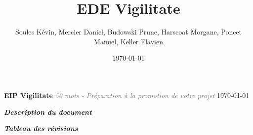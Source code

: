 \documentclass[a4paper,11pt]{report}
\title{EDE Vigilitate}
\author{Soules Kévin, Mercier Daniel, Budowski Prune, Harscoat Morgane, Poncet Manuel, Keller Flavien}
\date{\today}
\begin{document}

\begin{center}\textcolor{myBlue}{\Huge \textbf{EIP Vigilitate}}\linebreak
\thispagestyle{empty}
\textcolor{gray}{\textit{\Large 50 mots - Préparation à la promotion de votre projet}}\linebreak
{}
{\today}\end{center}
\newpage


%

\newpage
\begin{flushleft}
\textcolor{myBlue}{\textit{\large \textbf{Description du document}}}\linebreak


\bigbreak

\textcolor{myBlue}{\textit{\large \textbf{Tableau des révisions}}}
\bigbreak


\end{flushleft}
\thispagestyle{fancy}
\newpage


%


%
%
%
%
%

%
%

\end{document}
